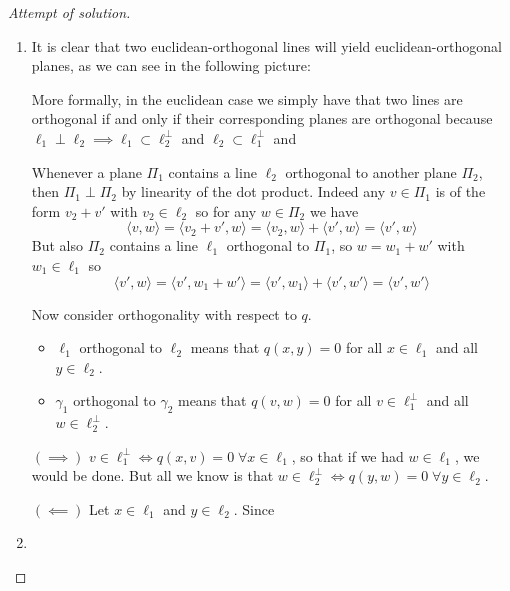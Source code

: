 \documentclass{article}
\begin{document}
\begin{proof}[Attempt of solution]\leavevmode
	\begin{enumerate}[label*=\alph*.]
		\item It is clear that two euclidean-orthogonal lines will yield euclidean-orthogonal planes, as we can see in the following picture:

		More formally, in the euclidean case we simply have that two lines are orthogonal if and only if their corresponding planes are orthogonal because $\ell_1\perp\ell_2\implies\ell_1\subset\ell_2^\perp$ and $\ell_2\subset\ell_1^\perp$ and 
		
		Whenever a plane $\Pi_1$ contains a line $\ell_2$ orthogonal to another plane $\Pi_2$, then $\Pi_1\perp\Pi_2$ by linearity of the dot product. Indeed any $v\in\Pi_1$ is of the form $v_2+v'$ with $v_2\in\ell_2$ so for any $w\in\Pi_2$ we have \[\langle v, w\rangle=\langle v_2+v',w\rangle=\langle v_2,w\rangle+\langle v',w\rangle=\langle v',w\rangle\]
		But also $\Pi_2$ contains a line $\ell_1$ orthogonal to $\Pi_1$, so $w=w_1+w'$ with $w_1\in\ell_1$ so
		\[\langle v',w\rangle=\langle v',w_1+w'\rangle=\langle v',w_1\rangle+\langle v',w'\rangle=\langle v',w'\rangle\]
		
		Now consider orthogonality with respect to $q$. 
		
		\begin{itemize}
			\item $\ell_1$ orthogonal to $\ell_2$ means that $q(x,y)=0$ for all $x\in\ell_1$ and all $y\in\ell_2$.
			\item $\gamma_1$ orthogonal to $\gamma_2$ means that $q(v,w)=0$ for all $v\in\ell_1^\perp$ and all $w\in\ell_2^\perp$.
		\end{itemize}
		$(\implies)$ $v\in\ell^\perp_1\iff q(x,v)=0\;\forall x\in\ell_1$, so that if we had $w\in\ell_1$, we would be done. But all we know is that $w\in\ell^\perp_2\iff q(y,w)=0\;\forall y\in\ell_2$.
		
		$(\impliedby)$ Let $x\in\ell_1$ and $y\in\ell_2$. Since 

		\item 
	\end{enumerate}
\end{proof}\fi
\end{document}
